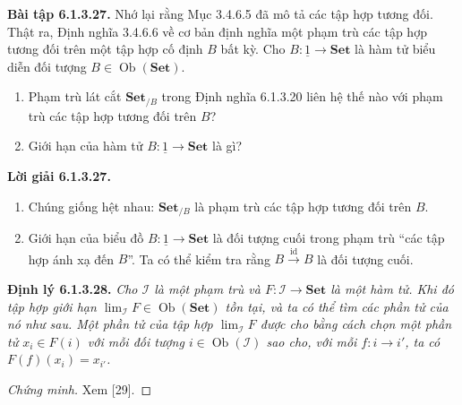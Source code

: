 \noindent\textbf{Bài tập 6.1.3.27.} Nhớ lại rằng Mục 3.4.6.5 đã mô tả các tập hợp tương đối. Thật ra, Định nghĩa 3.4.6.6 về cơ bản định nghĩa một phạm trù các tập hợp tương đối trên một tập hợp cố định $B$ bất kỳ. Cho $B:\underline1\to\mathbf{Set}$ là hàm tử biểu diễn đối tượng $B\in\operatorname{Ob}(\mathbf{Set})$.
\begin{enumerate}[label=\alph*.]\item Phạm trù lát cắt $\mathbf{Set}_{/B}$ trong Định nghĩa 6.1.3.20 liên hệ thế nào với phạm trù các tập hợp tương đối trên $B$?\item Giới hạn của hàm tử $B:\underline1\to\mathbf{Set}$ là gì?\end{enumerate}
\noindent\textbf{Lời giải 6.1.3.27.}\keepwithnext
\begin{enumerate}[label=\alph*.]\item Chúng giống hệt nhau: $\mathbf{Set}_{/B}$ là phạm trù các tập hợp tương đối trên $B$.\item Giới hạn của biểu đồ $B:\underline1\to\mathbf{Set}$ là đối tượng cuối trong phạm trù ``các tập hợp ánh xạ đến $B$''. Ta có thể kiểm tra rằng $B\xrightarrow{\mathrm{id}}B$ là đối tượng cuối.\end{enumerate}

\noindent\textbf{Định lý 6.1.3.28.} \emph{Cho $\mathcal I$ là một phạm trù và $F:\mathcal I\to\mathbf{Set}$ là một hàm tử. Khi đó tập hợp giới hạn $\lim_{\mathcal I}F\in\operatorname{Ob}(\mathbf{Set})$ tồn tại, và ta có thể tìm các phần tử của nó như sau. Một phần tử của tập hợp $\lim_{\mathcal I}F$ được cho bằng cách chọn một phần tử $x_i\in F(i)$ với mỗi đối tượng $i\in\operatorname{Ob}(\mathcal I)$ sao cho, với mỗi $f:i\to i'$, ta có $F(f)(x_i)=x_{i'}$.}
\begin{proof}[Chứng minh]Xem [29].\end{proof}

